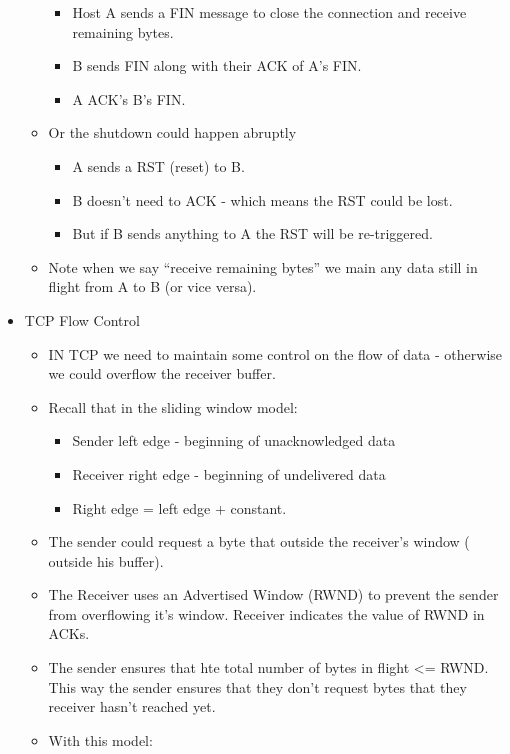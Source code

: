 \documentclass[]{article}
\providecommand{\tightlist}{%
  \setlength{\itemsep}{0pt}\setlength{\parskip}{0pt}}
\begin{document}
\begin{itemize}
\begin{itemize}
    \begin{itemize}
    \tightlist
    \item
      Host A sends a FIN message to close the connection and receive
      remaining bytes.
    \item
      B sends FIN along with their ACK of A's FIN.
    \item
      A ACK's B's FIN.
    \end{itemize}
  \item
    Or the shutdown could happen abruptly

    \begin{itemize}
    \tightlist
    \item
      A sends a RST (reset) to B.
    \item
      B doesn't need to ACK - which means the RST could be lost.
    \item
      But if B sends anything to A the RST will be re-triggered.
    \end{itemize}
  \item
    Note when we say ``receive remaining bytes'' we main any data still
    in flight from A to B (or vice versa).
  \end{itemize}
\item
  TCP Flow Control

  \begin{itemize}
  \tightlist
  \item
    IN TCP we need to maintain some control on the flow of data -
    otherwise we could overflow the receiver buffer.
  \item
    Recall that in the sliding window model:

    \begin{itemize}
    \tightlist
    \item
      Sender left edge - beginning of unacknowledged data
    \item
      Receiver right edge - beginning of undelivered data
    \item
      Right edge = left edge + constant.
    \end{itemize}
  \item
    The sender could request a byte that outside the receiver's window (
    outside his buffer).
  \item
    The Receiver uses an Advertised Window (RWND) to prevent the sender
    from overflowing it's window. Receiver indicates the value of RWND
    in ACKs.
  \item
    The sender ensures that hte total number of bytes in flight
    \textless{}= RWND. This way the sender ensures that they don't
    request bytes that they receiver hasn't reached yet.
  \item
    With this model:


\end{itemize}
\end{itemize}
\end{document}
